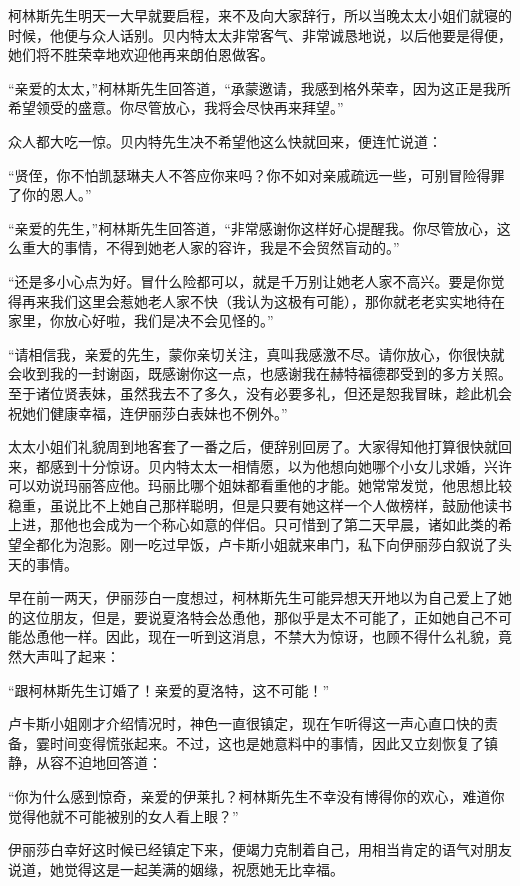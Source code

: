\par 柯林斯先生明天一大早就要启程，来不及向大家辞行，所以当晚太太小姐们就寝的时候，他便与众人话别。贝内特太太非常客气、非常诚恳地说，以后他要是得便，她们将不胜荣幸地欢迎他再来朗伯恩做客。
\par “亲爱的太太，”柯林斯先生回答道，“承蒙邀请，我感到格外荣幸，因为这正是我所希望领受的盛意。你尽管放心，我将会尽快再来拜望。”
\par 众人都大吃一惊。贝内特先生决不希望他这么快就回来，便连忙说道：
\par “贤侄，你不怕凯瑟琳夫人不答应你来吗？你不如对亲戚疏远一些，可别冒险得罪了你的恩人。”
\par “亲爱的先生，”柯林斯先生回答道，“非常感谢你这样好心提醒我。你尽管放心，这么重大的事情，不得到她老人家的容许，我是不会贸然盲动的。”
\par “还是多小心点为好。冒什么险都可以，就是千万别让她老人家不高兴。要是你觉得再来我们这里会惹她老人家不快（我认为这极有可能），那你就老老实实地待在家里，你放心好啦，我们是决不会见怪的。”
\par “请相信我，亲爱的先生，蒙你亲切关注，真叫我感激不尽。请你放心，你很快就会收到我的一封谢函，既感谢你这一点，也感谢我在赫特福德郡受到的多方关照。至于诸位贤表妹，虽然我去不了多久，没有必要多礼，但还是恕我冒昧，趁此机会祝她们健康幸福，连伊丽莎白表妹也不例外。”
\par 太太小姐们礼貌周到地客套了一番之后，便辞别回房了。大家得知他打算很快就回来，都感到十分惊讶。贝内特太太一相情愿，以为他想向她哪个小女儿求婚，兴许可以劝说玛丽答应他。玛丽比哪个姐妹都看重他的才能。她常常发觉，他思想比较稳重，虽说比不上她自己那样聪明，但是只要有她这样一个人做榜样，鼓励他读书上进，那他也会成为一个称心如意的伴侣。只可惜到了第二天早晨，诸如此类的希望全都化为泡影。刚一吃过早饭，卢卡斯小姐就来串门，私下向伊丽莎白叙说了头天的事情。
\par 早在前一两天，伊丽莎白一度想过，柯林斯先生可能异想天开地以为自己爱上了她的这位朋友，但是，要说夏洛特会怂恿他，那似乎是太不可能了，正如她自己不可能怂恿他一样。因此，现在一听到这消息，不禁大为惊讶，也顾不得什么礼貌，竟然大声叫了起来：
\par “跟柯林斯先生订婚了！亲爱的夏洛特，这不可能！”
\par 卢卡斯小姐刚才介绍情况时，神色一直很镇定，现在乍听得这一声心直口快的责备，霎时间变得慌张起来。不过，这也是她意料中的事情，因此又立刻恢复了镇静，从容不迫地回答道：
\par “你为什么感到惊奇，亲爱的伊莱扎？柯林斯先生不幸没有博得你的欢心，难道你觉得他就不可能被别的女人看上眼？”
\par 伊丽莎白幸好这时候已经镇定下来，便竭力克制着自己，用相当肯定的语气对朋友说道，她觉得这是一起美满的姻缘，祝愿她无比幸福。
